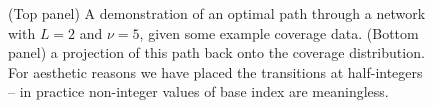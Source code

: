 \documentclass[fleqn,usenatbib]{mnras}
\begin{document}
\begin{figure}
\begin{center}
{
						}
						\caption{(Top panel) A demonstration of an optimal path through a network with $L=2$ and $\nu=5$, given some example coverage data. (Bottom panel) a projection of this path back onto the coverage distribution. For aesthetic reasons we have placed the transitions at half-integers -- in practice non-integer values of base index are meaningless.}\label{F:Path}
					\end{center}
				\end{figure}



\end{document}
